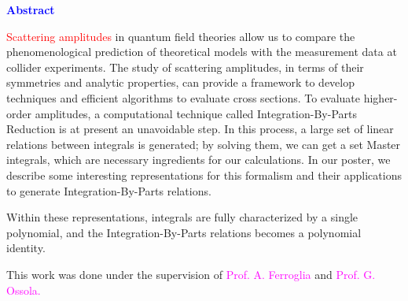 \documentclass[10pt]{article}
\begin{document}
\textbf{\textcolor{blue}{Abstract}}

\textcolor{red}{Scattering amplitudes} in quantum field theories allow us to compare the phenomenological prediction of theoretical models with the measurement data at collider experiments.
The study of scattering amplitudes, in terms of their symmetries and analytic properties, can provide a framework to develop techniques and efficient algorithms to evaluate cross sections.
To evaluate higher-order amplitudes, a computational technique called Integration-By-Parts Reduction is at present an unavoidable step.
In this process, a large set of linear relations between integrals is generated; by solving them, we can get a set Master integrals, which are necessary ingredients for our calculations.
In our poster, we describe some interesting representations for this formalism and their applications to generate Integration-By-Parts relations.

Within these representations, integrals are fully characterized by a single polynomial, and the Integration-By-Parts relations becomes a polynomial identity.

{\footnotesize This work was done under the supervision of \textcolor{magenta}{Prof. A. Ferroglia} and \textcolor{magenta}{Prof. G. Ossola.}}
\end{document}
